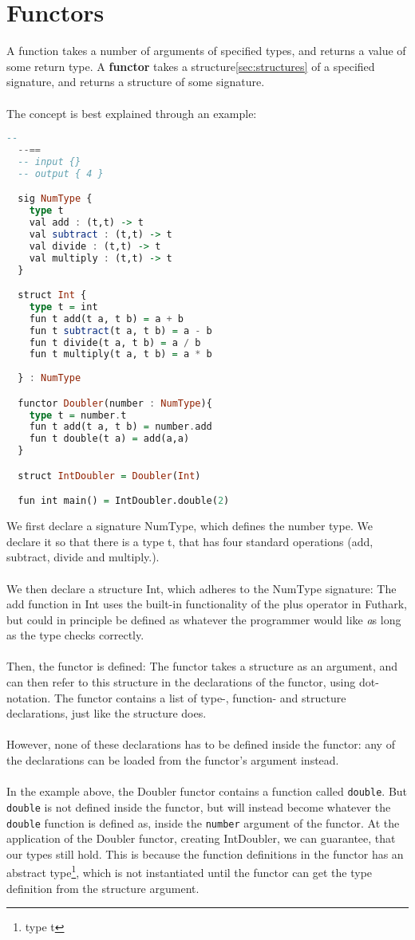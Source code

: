 \section{Functors}
\label{sec:functors}
A function takes a number of arguments of specified types, and returns a value of some return type.
A \textbf{functor} takes a structure\ref{sec:structures} of a specified signature,
and returns a structure of some signature.
\\
\\
The concept is best explained through an example:
\begin{lstlisting}[language=Haskell]
  --
  --==
  -- input {}
  -- output { 4 }

  sig NumType {
    type t
    val add : (t,t) -> t
    val subtract : (t,t) -> t
    val divide : (t,t) -> t
    val multiply : (t,t) -> t
  }

  struct Int {
    type t = int
    fun t add(t a, t b) = a + b
    fun t subtract(t a, t b) = a - b
    fun t divide(t a, t b) = a / b
    fun t multiply(t a, t b) = a * b
    
  } : NumType

  functor Doubler(number : NumType){
    type t = number.t
    fun t add(t a, t b) = number.add
    fun t double(t a) = add(a,a) 
  }

  struct IntDoubler = Doubler(Int)

  fun int main() = IntDoubler.double(2)
\end{lstlisting}
We first declare a signature NumType, which defines the number type. We declare it so
that there is a type t, that has four standard operations (add, subtract, divide
and multiply.).
\\
\\
We then declare a structure Int, which adheres to the NumType signature:
The add function in Int uses the built-in functionality of the plus operator in
Futhark, but could in principle be defined as whatever the programmer would
like \emph as long as the type checks correctly.
\\
\\
Then, the functor is defined: The functor takes a structure as an argument, and
can then refer to this structure in the declarations of the functor, using
dot-notation.
The functor contains a list of type-, function- and structure declarations, just
like the structure does.
\\
\\
However, none of these declarations has to be defined inside the functor: any of the declarations can be loaded from the functor's argument instead.
\\
\\
In the example above, the Doubler functor contains a function called
\texttt{double}. But \texttt{double} is not defined inside the functor, but will
instead become whatever the \texttt{double} function is defined as, inside the \texttt{number}
argument of the functor.
At the application of the Doubler functor, creating IntDoubler, we can
guarantee, that our types still hold. This is because the function definitions
in the functor has an abstract type\footnote{type t}, which is not instantiated
until the functor can get the type definition from the structure argument.

